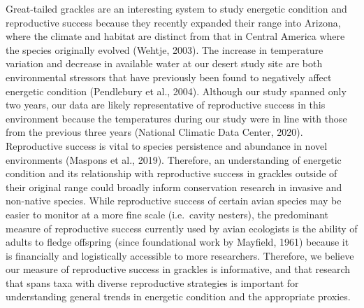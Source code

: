 \documentclass[
]{article}
\begin{document}
Great-tailed grackles are an interesting system to study energetic
condition and reproductive success because they recently expanded their
range into Arizona, where the climate and habitat are distinct from that
in Central America where the species originally evolved (Wehtje, 2003).
The increase in temperature variation and decrease in available water at
our desert study site are both environmental stressors that have
previously been found to negatively affect energetic condition
(Pendlebury et al., 2004). Although our study spanned only two years,
our data are likely representative of reproductive success in this
environment because the temperatures during our study were in line with
those from the previous three years (National Climatic Data Center,
2020). Reproductive success is vital to species persistence and
abundance in novel environments (Maspons et al., 2019). Therefore, an
understanding of energetic condition and its relationship with
reproductive success in grackles outside of their original range could
broadly inform conservation research in invasive and non-native species.
While reproductive success of certain avian species may be easier to
monitor at a more fine scale (i.e.~cavity nesters), the predominant
measure of reproductive success currently used by avian ecologists is
the ability of adults to fledge offspring (since foundational work by
Mayfield, 1961) because it is financially and logistically accessible to
more researchers. Therefore, we believe our measure of reproductive
success in grackles is informative, and that research that spans taxa
with diverse reproductive strategies is important for understanding
general trends in energetic condition and the appropriate proxies.
\end{document}
